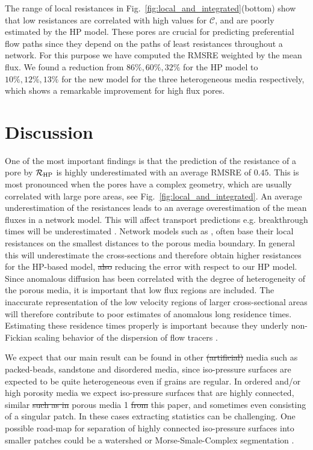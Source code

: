 \documentclass[draft]{agujournal2019}
\providecommand{\DIFadd}[1]{{\protect\color{blue}\uwave{#1}}} %
\providecommand{\DIFdel}[1]{{\protect\color{red}\sout{#1}}}                      %
\providecommand{\DIFaddbegin}{} %
\providecommand{\DIFaddend}{} %
\providecommand{\DIFdelbegin}{} %
\providecommand{\DIFdelend}{} %
\begin{document}
The range of local resistances in Fig.~\ref{fig:local_and_integrated}(bottom) show that low resistances are correlated with high values for $\mathcal{C}$, and are poorly estimated by the HP model. These pores are crucial for predicting preferential flow paths since they depend on the paths of least resistances throughout a network. For this purpose we have computed the RMSRE weighted by the mean flux. We found a reduction from $86\%, 60\%, 32\%$ for the HP model to $10\%, 12\%, 13\%$ for the new model for the three heterogeneous media respectively, which shows a remarkable improvement for high flux pores.  


\section{Discussion}

One of the most important findings is that the prediction of the resistance of a pore by $\mathcal{R}_{\rm{HP}}$ is highly underestimated with an average RMSRE of $0.45$. This is most pronounced when the pores have a complex geometry, which are usually correlated with large pore areas, see Fig.~\ref{fig:local_and_integrated}. An average underestimation of the resistances leads to an average overestimation of the mean fluxes in a network model. This will affect transport predictions e.g. breakthrough times will be underestimated \cite{dentz_mechanisms_2018}. Network models such as \cite{alim_local_2017}, often base their local resistances on the smallest distances to the porous media boundary. In general this will underestimate the cross-sections and therefore obtain higher resistances for the HP-based model, \DIFdelbegin \DIFdel{also }\DIFdelend \DIFaddbegin \DIFadd{potentially }\DIFaddend reducing the error with respect to our HP model. Since anomalous diffusion has been correlated with the degree of heterogeneity of the porous media, it is important that low flux regions are included. The inaccurate representation of the low velocity regions of larger cross-sectional areas will therefore contribute to poor estimates of anomalous long residence times. Estimating these residence times properly is important because they underly non-Fickian scaling behavior of the dispersion of flow tracers \cite{dentz_mechanisms_2018,dentz_delay_2006}.

We expect that our main result can be found in other \DIFdelbegin \DIFdel{(artificial) }\DIFdelend media such as packed-beads, sandstone and disordered media, since iso-pressure surfaces are expected to be quite heterogeneous even if grains are regular. In ordered and/or high porosity media we expect iso-pressure surfaces that are highly connected, similar \DIFdelbegin \DIFdel{such as in }\DIFdelend \DIFaddbegin \DIFadd{to }\DIFaddend porous media 1 \DIFdelbegin \DIFdel{from }\DIFdelend \DIFaddbegin \DIFadd{in }\DIFaddend this paper, and sometimes even consisting of a singular patch. In these cases extracting statistics can be challenging. One possible road-map for separation of highly connected iso-pressure surfaces into smaller patches could be a watershed or Morse-Smale-Complex segmentation \cite{tierny_topology_2018}. 
\end{document}
